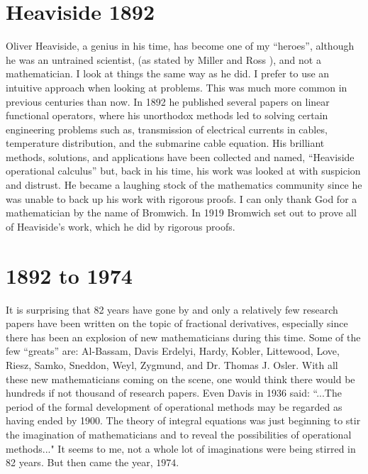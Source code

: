 \documentclass[a4paper,14pt,oneside]{book}
\theoremstyle{plain}
\theoremstyle{definition}
\theoremstyle{remark}
\begin{document}
\section{Heaviside 1892}
\begin{center}
         \begin{flushleft} 
         \justify
         \Large{
\par{Oliver Heaviside, a genius in his time, has become one of my \enquote{heroes}, although he was an untrained scientist, (as stated by Miller and Ross \cite{bb10}), and not a mathematician. I look at things the same way as he did. I prefer to use an intuitive approach when looking at problems. This was much more common in previous centuries than now. In 1892 he published several papers on linear functional operators, where his unorthodox methods led to solving certain engineering problems such as, transmission of electrical currents in cables, temperature distribution, and the submarine cable equation. His brilliant methods, solutions, and applications have been collected and named, \enquote{Heaviside operational calculus} but, back in his time, his work was looked at with suspicion and distrust. He became a laughing stock of the mathematics community since he was unable to back up his work with rigorous proofs. I can only thank God for a mathematician by the name of Bromwich. In 1919 Bromwich set out to prove all of Heaviside's work, which he did by rigorous proofs.}}
\end{flushleft}        
\end{center}

\section{ 1892 to 1974}
\begin{center}
         \begin{flushleft} 
         \justify
         \Large{
\par{It is surprising that 82 years have gone by and only a relatively few research papers have been written on the topic of fractional derivatives, especially since there has been an explosion of new mathematicians during this time. Some of the few \enquote{greats} are: Al-Bassam, Davis Erdelyi, Hardy, Kobler, Littewood, Love, Riesz, Samko, Sneddon, Weyl, Zygmund, and Dr. Thomas J. Osler. With all these new mathematicians coming on the scene, one would think there would be hundreds if not thousand of research papers. Even Davis in 1936 said: \textquotedblleft...The period of the formal development of operational methods may be regarded as having ended by 1900. The theory of integral equations was just beginning to stir the imagination of mathematicians and to reveal the possibilities of operational methods..." It seems to me, not a whole lot of imaginations were being stirred in 82 years. But then came the year, $1974$.}}
\end{flushleft}        
\end{center}
\end{document}
